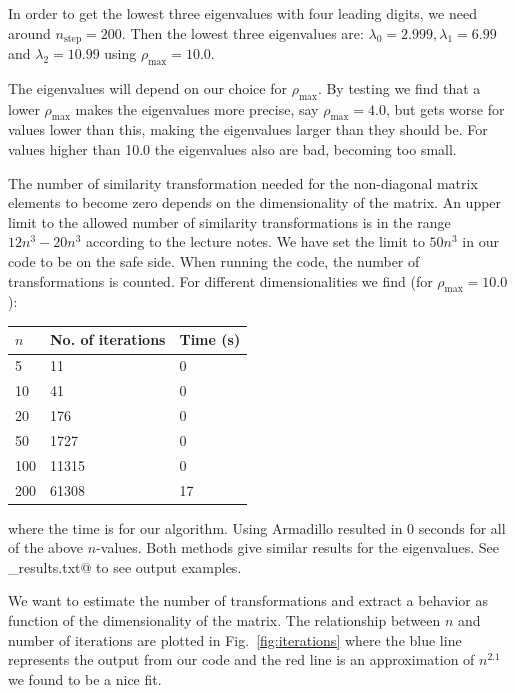 \documentclass{article}
\begin{document}
\begin{multicols}{2}
In order to get the lowest three eigenvalues with four leading digits, we need around $n_{\textrm{step}} = 200$. Then the lowest three eigenvalues are: $\lambda_0 = 2.999, \lambda_1 = 6.99$ and $\lambda_2 = 10.99$ using $\rho_{\textrm{max}} = 10.0$. 

The eigenvalues will depend on our choice for $\rho_{\textrm{max}}$. By testing we find that a lower $\rho_{\textrm{max}}$ makes the eigenvalues more precise, say $\rho_{\textrm{max}} = 4.0$, but gets worse for values lower than this, making the eigenvalues larger than they should be. For values higher than 10.0 the eigenvalues also are bad, becoming too small.

The number of similarity transformation needed for the non-diagonal matrix elements to become zero depends on the dimensionality of the matrix. An upper limit to the allowed number of similarity transformations is in the range $12n^3 - 20n^3$ according to the lecture notes. We have set the limit to $50n^3$ in our code to be on the safe side. When running the code, the number of transformations is counted. For different dimensionalities we find (for $\rho_{\textrm{max}} = 10.0$):

\begin{center}
\begin{tabular}{ l l l}\hline
	$n$ 			& No. of iterations	 	& Time (s) \\ \hline
	5 			& 11 					& 0\\
	10 			& 41					& 0\\
	20 			& 176 				& 0\\
	50 			& 1727 				& 0\\
	100	  		& 11315				& 0 \\
	200  			& 61308				& 17 \\
	\hline
\end{tabular}
\end{center}
where the time is for our algorithm. Using Armadillo resulted in 0 seconds for all of the above $n$-values. Both methods give similar results for the eigenvalues. See \verb@selected_results.txt@ to see output examples.

We want to estimate the number of transformations and extract a behavior as function of the dimensionality of the matrix. The relationship between $n$ and number of iterations are plotted in Fig.~\ref{fig:iterations} where the blue line represents the output from our code and the red line is an approximation of $n^{2.1}$ we found to be a nice fit.


\end{multicols}
\end{document}
